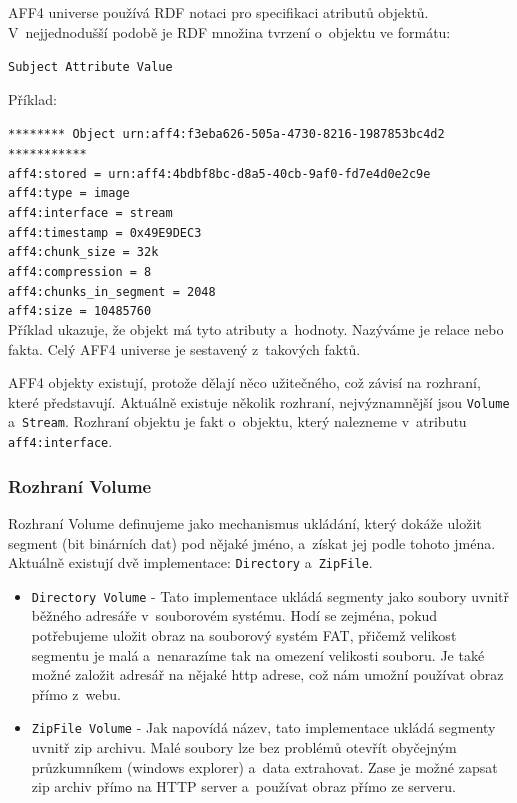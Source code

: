 \noindent AFF4 universe používá RDF notaci pro specifikaci atributů objektů. V~nejjednodušší podobě je RDF množina tvrzení o~objektu ve formátu:

\texttt{Subject   Attribute   Value}

\vspace{0.5cm}

\noindent Příklad:

\noindent \texttt{******** Object urn:aff4:f3eba626-505a-4730-8216-1987853bc4d2 ***********}\\
\texttt{aff4:stored = urn:aff4:4bdbf8bc-d8a5-40cb-9af0-fd7e4d0e2c9e}\\
\texttt{aff4:type = image}\\
\texttt{aff4:interface = stream}\\
\texttt{aff4:timestamp = 0x49E9DEC3}\\
\texttt{aff4:chunk\_size = 32k}\\
\texttt{aff4:compression = 8}\\
\texttt{aff4:chunks\_in\_segment = 2048}\\
\texttt{aff4:size = 10485760}\\

\noindent Příklad ukazuje, že objekt má tyto atributy a~hodnoty. Nazýváme je relace nebo fakta. Celý AFF4 universe je sestavený z~takových faktů.

\noindent AFF4 objekty existují, protože dělají něco užitečného, což závisí na rozhraní, které představují. Aktuálně existuje několik rozhraní, nejvýznamnější jsou \texttt{Volume} a~\texttt{Stream}. Rozhraní objektu je fakt o~objektu, který nalezneme v~atributu \texttt{aff4:interface}.

\subsubsection{Rozhraní Volume}
Rozhraní Volume definujeme jako mechanismus ukládání, který dokáže uložit segment (bit binárních dat) pod nějaké jméno, a~získat jej podle tohoto jména. Aktuálně existují dvě implementace: \texttt{Directory} a~\texttt{ZipFile}.

\begin{itemize}
\item \texttt{Directory Volume} - Tato implementace ukládá segmenty jako soubory uvnitř běžného adresáře v~souborovém systému. Hodí se zejména, pokud potřebujeme uložit obraz na souborový systém FAT, přičemž velikost segmentu je malá a~nenarazíme tak na omezení velikosti souboru. Je také možné založit adresář na nějaké http adrese, což nám umožní používat obraz přímo z~webu.

\item \texttt{ZipFile Volume} - Jak napovídá název, tato implementace ukládá segmenty uvnitř zip archivu. Malé soubory lze bez problémů otevřít obyčejným průzkumníkem (windows explorer) a~data extrahovat. Zase je možné zapsat zip archiv přímo na HTTP server a~používat obraz přímo ze serveru.
\end{itemize}

